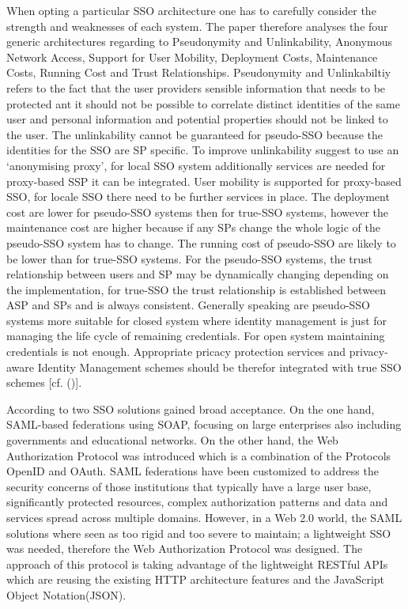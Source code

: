 {When opting a particular SSO architecture one has to carefully consider the strength and weaknesses of each system. The paper therefore analyses the four generic architectures regarding to Pseudonymity and Unlinkability, Anonymous Network Access, Support for User Mobility, Deployment Costs, Maintenance Costs, Running Cost and Trust Relationships. Pseudonymity and Unlinkabiltiy refers to the fact that the user providers sensible information that needs to be protected ant it should not be possible to correlate distinct identities of the same user and personal information and potential properties should not be linked to the user. The unlinkability cannot be guaranteed for pseudo-SSO because the identities for the SSO are SP specific. To improve unlinkability   \cite{Pashalidis:2003:10.1007/3-540-45067-X_22} suggest to use an ‘anonymising proxy’, for local SSO system additionally services are needed for proxy-based SSP it can be integrated. User mobility is supported for proxy-based SSO, for locale SSO there need to be further services in place. The deployment cost are lower for pseudo-SSO systems then for true-SSO systems, however the maintenance cost are higher because if any SPs change the whole logic of the pseudo-SSO system has to change. The running cost of pseudo-SSO are likely to be lower than for true-SSO systems. For the pseudo-SSO systems, the trust relationship between users and SP may be dynamically changing depending on the implementation, for true-SSO the trust relationship is established between ASP and SPs and is always consistent. Generally speaking are pseudo-SSO systems more suitable for closed system where identity management is just for managing the life cycle of remaining credentials. For open system maintaining credentials is not enough. Appropriate pricacy protection services and privacy-aware Identity Management schemes should be therefor integrated with true SSO schemes [cf. (\cite{Pashalidis:2003:10.1007/3-540-45067-X_22})]. 


According to \cite{Lynch:2017:IIG} two SSO solutions gained broad acceptance. On the one hand, SAML-based federations using SOAP, focusing on large enterprises also including governments and educational networks. On the other hand, the Web Authorization Protocol was introduced which is a combination of the Protocols OpenID and OAuth. SAML federations have been customized to address the security concerns of those institutions that typically have a large user base, significantly protected resources, complex authorization patterns and data and services spread across multiple domains. However, in a Web 2.0 world, the SAML solutions where seen as too rigid and too severe to maintain; a lightweight SSO was needed, therefore the Web Authorization Protocol was designed. The approach of this protocol is taking advantage of the lightweight RESTful APIs which are reusing the existing HTTP architecture features and the JavaScript Object Notation(JSON).

}
